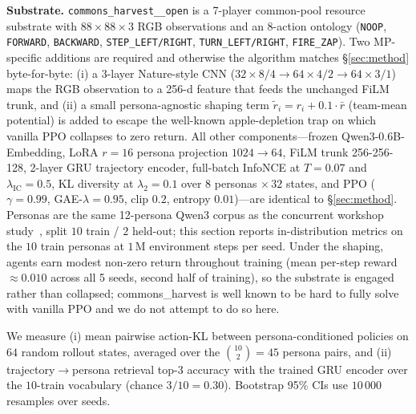 \documentclass[conference]{IEEEtran}
\begin{document}
\noindent\textbf{Substrate.}
\texttt{commons\_harvest\_\_open} is a 7-player common-pool resource substrate with
$88\!\times\!88\!\times\!3$ RGB observations and an 8-action ontology
(\texttt{NOOP}, \texttt{FORWARD}, \texttt{BACKWARD}, \texttt{STEP\_LEFT/RIGHT},
\texttt{TURN\_LEFT/RIGHT}, \texttt{FIRE\_ZAP}). Two MP-specific additions are
required and otherwise the algorithm matches \S\ref{sec:method} byte-for-byte:
(i) a 3-layer Nature-style CNN
($32\!\times\!8/4 \to 64\!\times\!4/2 \to 64\!\times\!3/1$) maps the RGB
observation to a 256-d feature that feeds the unchanged FiLM trunk, and (ii) a
small persona-agnostic shaping term $\tilde r_i = r_i + 0.1\cdot\bar r$
(team-mean potential) is added to escape the well-known apple-depletion trap on
which vanilla PPO collapses to zero return. All other components---frozen
Qwen3-0.6B-Embedding, LoRA $r\!=\!16$ persona projection $1024\!\to\!64$, FiLM
trunk 256-256-128, 2-layer GRU trajectory encoder, full-batch InfoNCE at
$T\!=\!0.07$ and $\lambda_{\text{IC}}\!=\!0.5$, KL diversity at
$\lambda_2\!=\!0.1$ over $8$ personas $\times\,32$ states, and PPO
($\gamma\!=\!0.99$, GAE-$\lambda\!=\!0.95$, clip $0.2$, entropy $0.01$)---are
identical to \S\ref{sec:method}. Personas are the same 12-persona Qwen3
corpus as the concurrent workshop study~\cite{phase5report}, split
$10$ train / $2$ held-out; this section reports in-distribution metrics on the
$10$ train personas at $1\,\text{M}$ environment steps per seed. Under the
shaping, agents earn modest non-zero return throughout training (mean per-step
reward $\approx\!0.010$ across all 5 seeds, second half of training), so the
substrate is engaged rather than collapsed; commons\_harvest is well known to be
hard to fully solve with vanilla PPO and we do not attempt to do so here.

We measure (i) mean pairwise action-KL between persona-conditioned policies on
$64$ random rollout states, averaged over the $\binom{10}{2}\!=\!45$ persona pairs,
and (ii) trajectory$\to$persona retrieval top-3 accuracy with the trained GRU
encoder over the $10$-train vocabulary (chance $3/10\!=\!0.30$). Bootstrap 95\%
CIs use $10\,000$ resamples over seeds.
\end{document}
